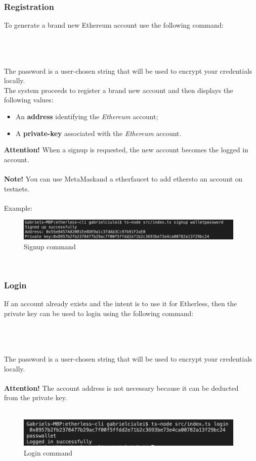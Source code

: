 \subsubsection{Registration}
To generate a brand new Ethereum account use the following command:\\\\
\centerline{}\\\\
The password is a user-chosen string that will be used to encrypt your credentials locally.\\
The system proceeds to register a brand new account and then displays the following values: 
\begin{itemize}
	\item An \textbf{address} identifying the \textit{Ethereum\glos} account;
	\item A \textbf{private-key\glos} associated with the \textit{Ethereum\glos} account.
\end{itemize}
\textbf{Attention!} When a signup is requested, the new account becomes the logged in account.\\\\
\textbf{Note!} You can use MetaMask\glo and a ether\glo faucet to add ethers\glo to an account on testnets.\\\\
Example:
	\begin{figure}[h]
		\centering
		\includegraphics[width=\textwidth]{res/img/Screenshot_signup.png}
		\caption{Signup command}
	\end{figure}\\
\subsubsection{Login}
If an account already exists and the intent is to use it for Etherless, then the private key can be used to login using the following command:\\\\
\centerline{}\\\\
The password is a user-chosen string that will be used to encrypt your credentials locally.\\\\ 
\textbf{Attention!} The account address is not necessary because it can be deducted from the private key.\\\\
\begin{figure}[h]
	\begin{center}
	\includegraphics[width=\textwidth]{res/img/Screenshot_login.png}
	\caption{Login command}
	\end{center}
\end{figure}
